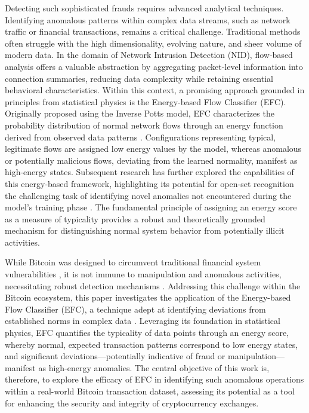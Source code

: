 \documentclass[12pt]{article}
\begin{document}
Detecting such sophisticated frauds requires advanced analytical techniques. Identifying anomalous patterns within complex
data streams, such as network traffic or financial transactions, remains a
critical challenge. Traditional methods often struggle with the high dimensionality, evolving nature, and sheer volume
of modern data. In the domain of Network Intrusion Detection (NID), flow-based analysis offers a valuable abstraction by
aggregating packet-level information into connection summaries, reducing data complexity while retaining essential
behavioral characteristics. Within this context, a promising approach grounded in principles from statistical physics
is the Energy-based Flow Classifier (EFC). Originally proposed using the Inverse Potts model, EFC characterizes the
probability distribution of normal network flows through an energy function derived from observed data patterns
\cite{pontes2019}. Configurations representing typical, legitimate flows are assigned low energy values by the model,
whereas anomalous or potentially malicious flows, deviating from the learned normality, manifest as high-energy states.
Subsequent research has further explored the capabilities of this energy-based framework, highlighting its potential for
open-set recognition the challenging task of identifying novel anomalies not encountered during the model's training
phase \cite{souza2022novelopensetenergybased}. The fundamental principle of assigning an energy score as a measure of typicality provides a
robust and theoretically grounded mechanism for distinguishing normal system behavior from potentially illicit activities.

While Bitcoin was designed to circumvent traditional financial system vulnerabilities \cite{nakamoto2008bitcoin}, it is
not immune to manipulation and anomalous activities, necessitating robust detection mechanisms \cite{zhang2020financial,
zainal2018review}. Addressing this challenge within the Bitcoin ecosystem, this paper investigates the application of the
Energy-based Flow Classifier (EFC), a technique adept at identifying deviations from established norms in complex data
\cite{pontes2019, souza2022novelopensetenergybased}. Leveraging its foundation in statistical physics, EFC quantifies the typicality of
data points through an energy score, whereby normal, expected transaction patterns correspond to low energy states, and
significant deviations—potentially indicative of fraud or manipulation—manifest as high-energy anomalies. The central
objective of this work is, therefore, to explore the efficacy of EFC in identifying such anomalous operations within a
real-world Bitcoin transaction dataset, assessing its potential as a tool for enhancing the security and integrity of
cryptocurrency exchanges.
\end{document}
